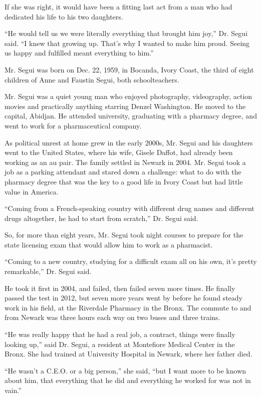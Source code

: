 If she was right, it would have been a fitting last act from a man who
had dedicated his life to his two daughters.

``He would tell us we were literally everything that brought him joy,''
Dr. Segui said. ``I knew that growing up. That's why I wanted to make
him proud. Seeing us happy and fulfilled meant everything to him.''

Mr. Segui was born on Dec. 22, 1959, in Bocanda, Ivory Coast, the third
of eight children of Anne and Faustin Segui, both schoolteachers.

Mr. Segui was a quiet young man who enjoyed photography, videography,
action movies and practically anything starring Denzel Washington. He
moved to the capital, Abidjan. He attended university, graduating with a
pharmacy degree, and went to work for a pharmaceutical company.

As political unrest at home grew in the early 2000s, Mr. Segui and his
daughters went to the United States, where his wife, Gisele Daffot, had
already been working as an au pair. The family settled in Newark in
2004. Mr. Segui took a job as a parking attendant and stared down a
challenge: what to do with the pharmacy degree that was the key to a
good life in Ivory Coast but had little value in America.

``Coming from a French-speaking country with different drug names and
different drugs altogether, he had to start from scratch,'' Dr. Segui
said.

So, for more than eight years, Mr. Segui took night courses to prepare
for the state licensing exam that would allow him to work as a
pharmacist.

``Coming to a new country, studying for a difficult exam all on his own,
it's pretty remarkable,'' Dr. Segui said.

He took it first in 2004, and failed, then failed seven more times. He
finally passed the test in 2012, but seven more years went by before he
found steady work in his field, at the Riverdale Pharmacy in the Bronx.
The commute to and from Newark was three hours each way on two buses and
three trains.

``He was really happy that he had a real job, a contract, things were
finally looking up,'' said Dr. Segui, a resident at Montefiore Medical
Center in the Bronx. She had trained at University Hospital in Newark,
where her father died.

``He wasn't a C.E.O. or a big person,'' she said, ``but I want more to
be known about him, that everything that he did and everything he worked
for was not in vain.''

